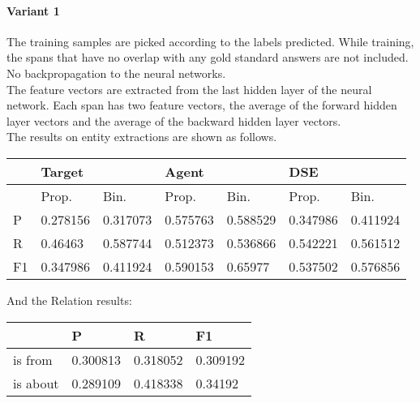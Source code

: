 \documentclass[a4paper, 12pt]{article}
\begin{document}
\paragraph{Variant 1}
The training samples are picked according to the labels predicted. While
training, the spans that have no overlap with any gold standard answers
are not included. No backpropagation to the neural networks. \\
The feature vectors are extracted from the last hidden layer of the neural
network. Each span has two feature vectors, the average of the forward hidden
layer vectors and the average of the backward hidden layer vectors.\\
The results on entity extractions are shown as follows.\\
\begin{table}[h!]
\centering
\begin{tabular}{l|ll|ll|ll}
\hline
   & \multicolumn{2}{l}{Target} & \multicolumn{2}{l}{Agent} & \multicolumn{2}{l}{DSE} \\ \hline
   & Prop.& Bin.& Prop.& Bin.& Prop.& Bin.\\
 \hline
P  &0.278156&0.317073 &0.575763 & 0.588529 &0.347986 & 0.411924 \\
R  &0.46463 &0.587744 &0.512373 & 0.536866 &0.542221 & 0.561512 \\
F1 &0.347986&0.411924 &0.590153 &  0.65977 &0.537502 & 0.576856 \\ \hline 
\end{tabular}
\end{table}
And the Relation results:
\begin{table}[h!]
\centering
\begin{tabular}{l|l|l|l}
\hline
         & P & R & F1    \\\hline
is from  & 0.300813& 0.318052& 0.309192\\
is about & 0.289109& 0.418338&  0.34192 \\
\hline
\end{tabular}
\end{table}
\end{document}
